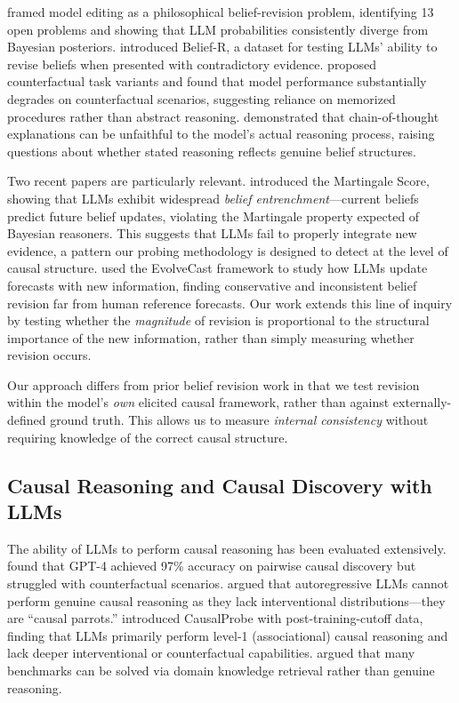 \documentclass[11pt]{article}
\begin{document}
\citet{hase2024belief} framed model editing as a philosophical belief-revision problem, identifying 13 open problems and showing that LLM probabilities consistently diverge from Bayesian posteriors. \citet{wilie2024beliefr} introduced Belief-R, a dataset for testing LLMs' ability to revise beliefs when presented with contradictory evidence. \citet{wu2024counterfactual} proposed counterfactual task variants and found that model performance substantially degrades on counterfactual scenarios, suggesting reliance on memorized procedures rather than abstract reasoning. \citet{turpin2024language} demonstrated that chain-of-thought explanations can be unfaithful to the model's actual reasoning process, raising questions about whether stated reasoning reflects genuine belief structures.

Two recent papers are particularly relevant. \citet{he2025martingale} introduced the Martingale Score, showing that LLMs exhibit widespread \textit{belief entrenchment}---current beliefs predict future belief updates, violating the Martingale property expected of Bayesian reasoners. This suggests that LLMs fail to properly integrate new evidence, a pattern our probing methodology is designed to detect at the level of causal structure. \citet{yuan2025evolvecast} used the EvolveCast framework to study how LLMs update forecasts with new information, finding conservative and inconsistent belief revision far from human reference forecasts. Our work extends this line of inquiry by testing whether the \textit{magnitude} of revision is proportional to the structural importance of the new information, rather than simply measuring whether revision occurs.

Our approach differs from prior belief revision work in that we test revision within the model's \textit{own} elicited causal framework, rather than against externally-defined ground truth. This allows us to measure \textit{internal consistency} without requiring knowledge of the correct causal structure.

\subsection{Causal Reasoning and Causal Discovery with LLMs}

The ability of LLMs to perform causal reasoning has been evaluated extensively. \citet{kiciman2023causal} found that GPT-4 achieved 97\% accuracy on pairwise causal discovery but struggled with counterfactual scenarios. \citet{zevcevic2023causal} argued that autoregressive LLMs cannot perform genuine causal reasoning as they lack interventional distributions---they are ``causal parrots.'' \citet{chi2024causalprobe} introduced CausalProbe with post-training-cutoff data, finding that LLMs primarily perform level-1 (associational) causal reasoning and lack deeper interventional or counterfactual capabilities. \citet{yang2024critical} argued that many benchmarks can be solved via domain knowledge retrieval rather than genuine reasoning.
\end{document}
